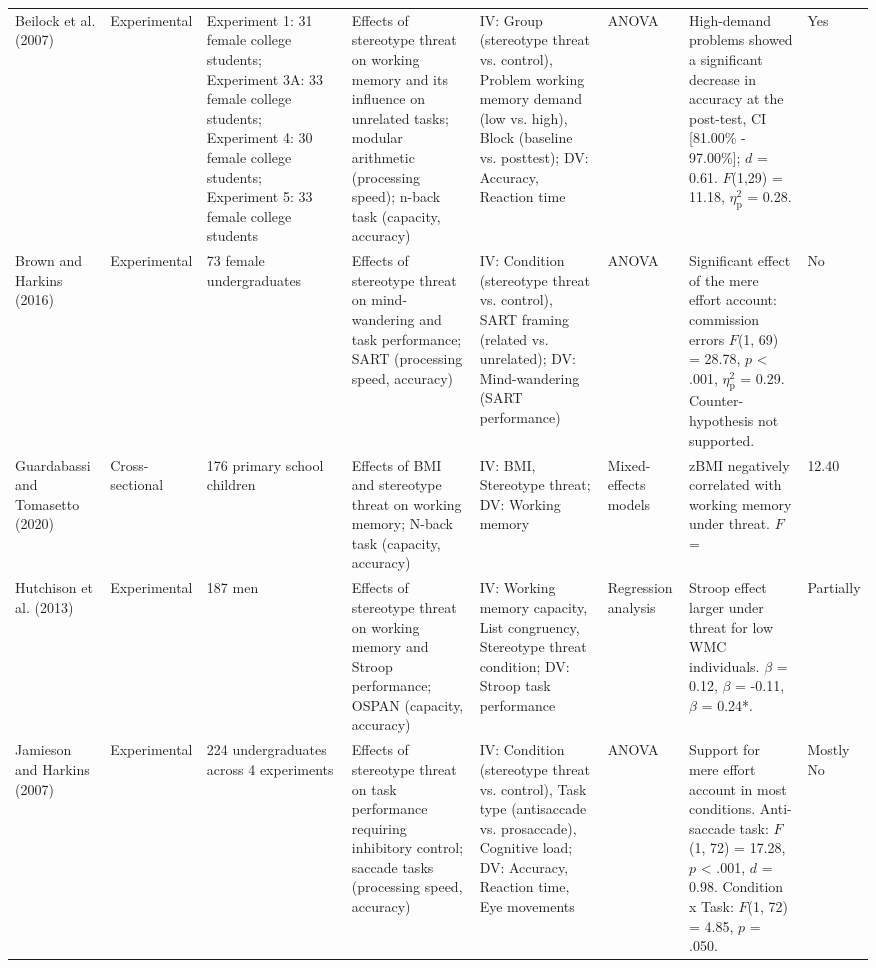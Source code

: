 \documentclass[
  stu, a4paper,floatsintext]{apa7}
\newenvironment{lltable}{\begin{landscape}\centering\begin{ThreePartTable}}{\end{ThreePartTable}\end{landscape}}
\begin{document}
\begin{lltable}
\begin{longtable}{p{1.5cm}p{3cm}p{2.5cm}p{3cm}p{3cm}p{3cm}p{3.5cm}p{1.5cm}}
Beilock et al. (2007) & Experimental & Experiment 1: 31 female college students; Experiment 3A: 33 female college students; Experiment 4: 30 female college students; Experiment 5: 33 female college students & Effects of stereotype threat on working memory and its influence on unrelated tasks; modular arithmetic (processing speed); n-back task (capacity, accuracy) & IV: Group (stereotype threat vs. control), Problem working memory demand (low vs. high), Block (baseline vs. posttest); DV: Accuracy, Reaction time & ANOVA & High-demand problems showed a significant decrease in accuracy at the post-test, CI [81.00\% - 97.00\%]; $\textit{d}$ = 0.61. $\textit{F}$(1,29) = 11.18, $\eta^{2}_\text{p}$ = 0.28. & Yes\\
Brown and Harkins (2016) & Experimental & 73 female undergraduates & Effects of stereotype threat on mind-wandering and task performance; SART (processing speed, accuracy) & IV: Condition (stereotype threat vs. control), SART framing (related vs. unrelated); DV: Mind-wandering (SART performance) & ANOVA & Significant effect of the mere effort account: commission errors $\textit{F}$(1, 69) = 28.78, $p$ < .001, $\eta^{2}_\text{p}$ = 0.29. Counter-hypothesis not supported. & No\\
Guardabassi and Tomasetto (2020) & Cross-sectional & 176 primary school children & Effects of BMI and stereotype threat on working memory; N-back task (capacity, accuracy) & IV: BMI, Stereotype threat; DV: Working memory & Mixed-effects models & zBMI negatively correlated with working memory under threat. $F$ = & 12.40\\
Hutchison et al. (2013) & Experimental & 187 men & Effects of stereotype threat on working memory and Stroop performance; OSPAN (capacity, accuracy) & IV: Working memory capacity, List congruency, Stereotype threat condition; DV: Stroop task performance & Regression analysis & Stroop effect larger under threat for low WMC individuals. $\beta$ = 0.12, $\beta$ = -0.11, $\beta$ = 0.24*. & Partially\\
Jamieson and Harkins (2007) & Experimental & 224 undergraduates across 4 experiments & Effects of stereotype threat on task performance requiring inhibitory control; saccade tasks (processing speed, accuracy) & IV: Condition (stereotype threat vs. control), Task type (antisaccade vs. prosaccade), Cognitive load; DV: Accuracy, Reaction time, Eye movements & ANOVA & Support for mere effort account in most conditions. Anti-saccade task: $F$(1, 72) = 17.28, $p$ < .001, $d$ = 0.98. Condition x Task: $F$(1, 72) = 4.85, $p$ = .050. & Mostly No\\

\end{longtable}
\end{lltable}
\end{document}
